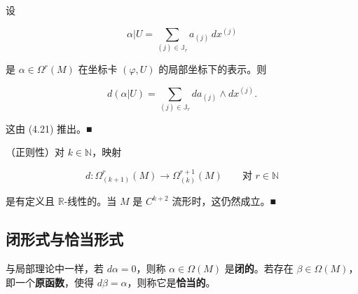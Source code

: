 \begin{remark}

\begin{items}
\item

设

\[
\alpha|U = \sum_{(j)\in\mathbb{J}_{r}} a_{(j)}\,dx^{(j)}
\]

是 $ \alpha\in\Omega^{r}(M) $ 在坐标卡 $ (\varphi, U) $ 的局部坐标下的表示。则

\[
d(\alpha|U) = \sum_{(j)\in\mathbb{J}_{r}} da_{(j)}\wedge dx^{(j)} .
\]

\proofhead
这由 (4.21) 推出。\nobreak\hspace{0.35em}■
\item

（正则性）对 $ k\in\mathbb{N} $，映射

\[
d: \Omega^{r}_{(k+1)}(M) \to \Omega^{r+1}_{(k)}(M) \qquad \text{对 } r\in\mathbb{N}
\]

是有定义且 $ \mathbb{R} $-线性的。当 $ M $ 是 $ C^{k+2} $ 流形时，这仍然成立。\nobreak\hspace{0.35em}■

\end{items}

\end{remark}

\subsection*{闭形式与恰当形式}

与局部理论中一样，若 $ d\alpha = 0 $，则称 $ \alpha\in\Omega(M) $ 是\textbf{闭的}。若存在 $ \beta\in\Omega(M) $，即一个\textbf{原函数}，使得 $ d\beta = \alpha $，则称它是\textbf{恰当的}。

